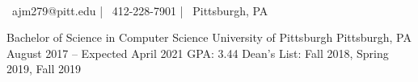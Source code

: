 \documentclass[]{awesome-cv}
\begin{document}
    
\begin{center}
	  \\
	\vspace{2mm}
	{\faEnvelope\ ajm279@pitt.edu} | {\faMobile\ 412-228-7901} | {\faMapMarker\ Pittsburgh, PA}%
\end{center}

\begin{cventries}
	\cventry
	{Bachelor of Science in Computer Science}
	{University of Pittsburgh}
	{Pittsburgh, PA}
	{August 2017 – Expected April 2021}
	{GPA: 3.44 \newline
	Dean's List: Fall 2018, Spring 2019, Fall 2019}
	
	
\end{cventries}
\end{document}

